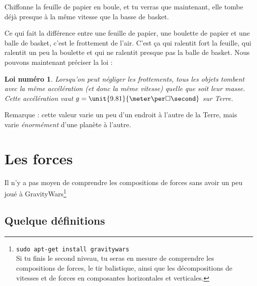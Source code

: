 \documentclass[a4paper,12pt]{book}
\newcounter{numloiphyz}
\theoremstyle{mes_exemples}	\newtheorem{exemple}[numtho]{Exemple}
\theoremstyle{mes_tho}
\newtheorem{loiphyz}[numloiphyz]{Loi numéro}
\begin{document}
Chiffonne la feuille de papier en boule, et tu verras que maintenant, elle tombe déjà presque à la même vitesse que la basse de basket.

Ce qui fait la différence entre une feuille de papier, une boulette de papier et une balle de basket, c'est le frottement de l'air. C'est ça qui ralentit fort la feuille, qui ralentit un peu la boulette et qui ne ralentit presque pas la balle de basket. Nous pouvons maintenant préciser la loi :
\begin{loiphyz}
Lorsqu'on peut négliger les frottements, tous les objets tombent avec la même accélération (et donc la même vitesse) quelle que soit leur masse. Cette accélération vaut $g=\unit{9.81}{\meter\per\square\second}$ sur Terre.
\end{loiphyz}
Remarque : cette valeur varie un peu d'un endroit à l'autre de la Terre, mais varie \emph{énormément} d'une planète à l'autre.



\section{Les forces}

Il n'y a pas moyen de comprendre les compositions de forces sans avoir un peu joué à GravityWars\footnote{\texttt{sudo apt-get install gravitywars}\\ Si tu finis le second niveau, tu seras en mesure de comprendre les compositions de forces, le tir balistique, ainsi que les décompositions de vitesses et de forces en composantes horizontales et verticales.} 

\subsection{Quelque définitions}

\end{document}
